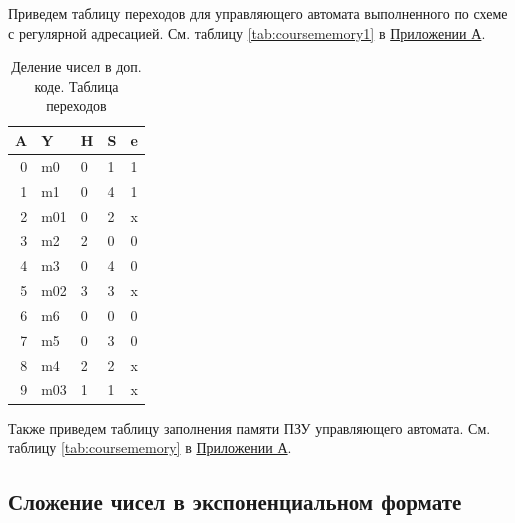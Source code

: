 \documentclass[a4paper,14pt]{extarticle}
\begin{document}
\normalsize
Приведем таблицу переходов для управляющего автомата выполненного по схеме с регулярной адресацией. См. таблицу \ref{tab:coursememory1} в \hyperref[tam]{Приложении А}.

\begin{table}[h!]
	\centering
	\begin{tabular}{|r||l|l|l|l|}
		\hline
		\multicolumn{1}{|l||}{\textbf{A}} & \textbf{Y} & \textbf{H} & \textbf{S} & \textbf{e} \\ \hline
		0 & m0 & 0 & 1 & 1 \\ \hline
		1 & m1 & 0 & 4 & 1 \\ \hline
		2 & m01 & 0 & 2 & x \\ \hline
		3 & m2 & 2 & 0 & 0 \\ \hline
		4 & m3 & 0 & 4 & 0 \\ \hline
		5 & m02 & 3 & 3 & x \\ \hline
		6 & m6 & 0 & 0 & 0 \\ \hline
		7 & m5 & 0 & 3 & 0 \\ \hline
		8 & m4 & 2 & 2 & x \\ \hline
		9 & m03 & 1 & 1 & x \\ \hline
	\end{tabular}
	\caption{Деление чисел в доп. коде. Таблица переходов}
	\label{tab:coursedivsteps}

\end{table}

Также приведем таблицу заполнения памяти ПЗУ управляющего автомата. См. таблицу \ref{tab:coursememory} в \hyperref[tam]{Приложении А}.

\subsection{Сложение чисел в экспоненциальном формате}
\end{document}
